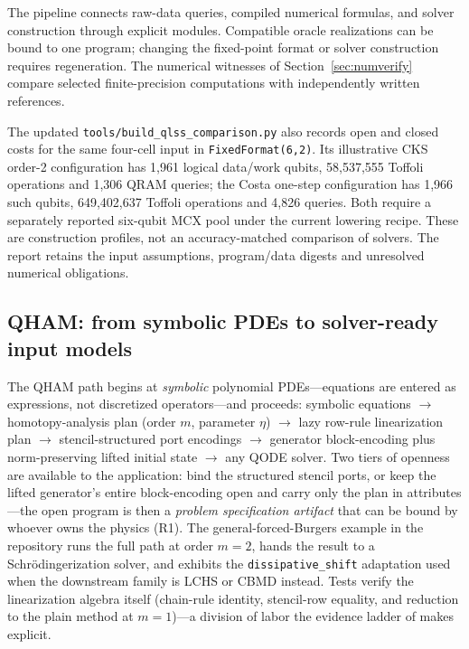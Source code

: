 The pipeline connects raw-data queries, compiled numerical formulas, and
solver construction through explicit modules. Compatible oracle
realizations can be bound to one program; changing the fixed-point format
or solver construction requires regeneration. The numerical witnesses of
Section~\ref{sec:numverify} compare selected finite-precision computations
with independently written references.

The updated \texttt{tools/build\_qlss\_comparison.py} also records open
and closed costs for the same four-cell input in
\texttt{FixedFormat(6,2)}. Its illustrative CKS order-2 configuration
has 1,961 logical data/work qubits, 58,537,555 Toffoli operations and
1,306 QRAM queries; the Costa one-step configuration has 1,966 such
qubits, 649,402,637 Toffoli operations and 4,826 queries.
Both require a separately reported six-qubit MCX pool under the current
lowering recipe. These are construction profiles, not an accuracy-matched
comparison of solvers. The report retains the input assumptions,
program/data digests and unresolved numerical obligations.

\subsection{QHAM: from symbolic PDEs to solver-ready input models}
\label{sec:qham-case}

The QHAM path begins at \emph{symbolic} polynomial PDEs---equations are
entered as expressions, not discretized operators---and proceeds: symbolic
equations $\rightarrow$ homotopy-analysis plan (order $m$, parameter
$\eta$) $\rightarrow$ lazy row-rule linearization plan $\rightarrow$
stencil-structured port encodings $\rightarrow$ generator block-encoding
plus norm-preserving lifted initial state $\rightarrow$ any QODE solver.
Two tiers of openness are available to the application: bind the structured
stencil ports, or keep the lifted generator's entire block-encoding open and
carry only the plan in attributes---the open program is then a
\emph{problem specification artifact} that can be bound by whoever owns the
physics (R1).  The general-forced-Burgers example in the repository runs
the full path at order $m=2$, hands the result to a Schr\"odingerization
solver, and exhibits the \texttt{dissipative\_shift} adaptation used when
the downstream family is LCHS or CBMD instead.  Tests verify the
linearization algebra itself (chain-rule identity, stencil-row equality,
and reduction to the plain method at $m=1$)---a division of labor the
evidence ladder of  makes explicit.

